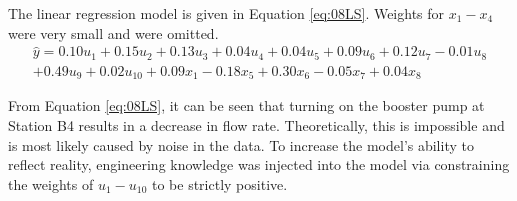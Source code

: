The linear regression model is given in Equation \ref{eq:08LS}.  Weights for $x_{1} - x_{4}$ were very small and were omitted.
\begin{multline}
    \hat{y} = 0.10u_1 + 0.15u_2 + 0.13u_3 + 0.04u_4 + 0.04u_5 + 0.09u_6 + 0.12u_7 - 0.01u_8 \\
    + 0.49u_9 + 0.02u_{10} + 0.09x_{1} - 0.18x_{5} + 0.30x_{6} - 0.05x_{7} + 0.04x_{8}
    \label{eq:08LS_eq}
\end{multline}

From Equation \ref{eq:08LS}, it can be seen that turning on the booster pump at Station B4 results in a decrease in flow rate.  Theoretically, this is impossible and is most likely caused by noise in the data.  To increase the model's ability to reflect reality, engineering knowledge was injected into the model via constraining the weights of $u_1 - u_{10}$ to be strictly positive.

%
%

